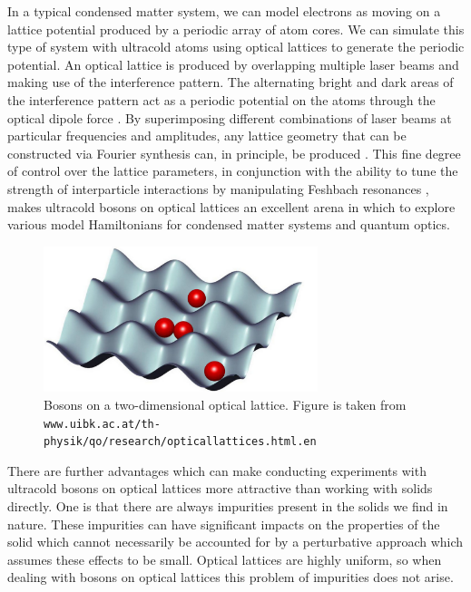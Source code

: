 \documentclass[a4paper, 10pt]{article}
\theoremstyle{plain}
\begin{document}
In a typical condensed matter system, we can model electrons as moving on a
lattice potential produced by a periodic array of atom cores. We can simulate
this type of system with ultracold atoms using optical lattices to generate the
periodic potential. An optical lattice is produced by overlapping multiple laser
beams and making use of the interference pattern. The alternating bright and
dark areas of the interference pattern act as a periodic potential on the atoms
through the optical dipole force \cite{Bloch2012}. By superimposing different
combinations of laser beams at particular frequencies and amplitudes, any
lattice geometry that can be constructed via Fourier synthesis can, in
principle, be produced \cite{Bloch2012}. This fine degree of control over the
lattice parameters, in conjunction with the ability to tune the strength of
interparticle interactions by manipulating Feshbach resonances \cite{Chin2010},
makes ultracold bosons on optical lattices an excellent arena in which to
explore various model Hamiltonians for condensed matter systems and quantum
optics.
\begin{figure}[bh!]
    \begin{center}
        \includegraphics[width=8cm]{bosons_on_lattice}
    \end{center}
    \caption{Bosons on a two-dimensional optical lattice. Figure is taken from\newline
             \texttt{www.uibk.ac.at/th-physik/qo/research/opticallattices.html.en}
            }
\end{figure}
There are further advantages which can make conducting experiments with
ultracold bosons on optical lattices more attractive than working with solids
directly. One is that there are always impurities present in the solids we find
in nature. These impurities can have significant impacts on the properties of
the solid which cannot necessarily be accounted for by a perturbative approach
which assumes these effects to be small. Optical lattices are highly uniform, so when
dealing with bosons on optical lattices this problem of impurities does not
arise.
\end{document}
